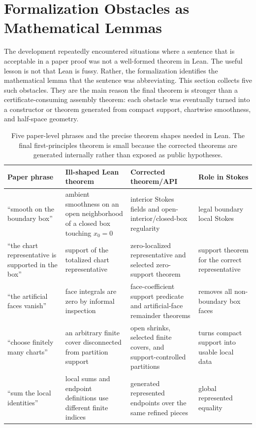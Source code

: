 \section{Formalization Obstacles as Mathematical Lemmas}
\label{sec:obstacles}

The development repeatedly encountered situations where a sentence that is
acceptable in a paper proof was not a well-formed theorem in Lean.  The useful
lesson is not that Lean is fussy.  Rather, the formalization identifies the
mathematical lemma that the sentence was abbreviating.  This section collects
five such obstacles.  They are the main reason the final theorem is stronger
than a certificate-consuming assembly theorem: each obstacle was eventually
turned into a constructor or theorem generated from compact support,
chartwise smoothness, and half-space geometry.

\begin{table}[t]
\centering
\scriptsize
\setlength{\tabcolsep}{3pt}
\begin{tabular}{p{}p{}p{}p{}}
\hline
Paper phrase & Ill-shaped Lean theorem & Corrected theorem/API & Role in Stokes \\
\hline
``smooth on the boundary box'' &
ambient smoothness on an open neighborhood of a closed box touching
\(x_0=0\) &
interior Stokes fields and open-interior/closed-box regularity &
legal boundary local Stokes \\

``the chart representative is supported in the box'' &
support of the totalized chart representative &
zero-localized representative and selected zero-support theorem &
support theorem for the correct representative \\

``the artificial faces vanish'' &
face integrals are zero by informal inspection &
face-coefficient support predicate and artificial-face remainder theorems &
removes all non-boundary box faces \\

``choose finitely many charts'' &
an arbitrary finite cover disconnected from partition support &
open shrinks, selected finite covers, and support-controlled partitions &
turns compact support into usable local data \\

``sum the local identities'' &
local sums and endpoint definitions use different finite indices &
generated represented endpoints over the same refined pieces &
global represented equality \\
\hline
\end{tabular}
\caption{Five paper-level phrases and the precise theorem shapes needed in
Lean.  The final first-principles theorem is small because the corrected
theorems are generated internally rather than exposed as public hypotheses.}
\label{tab:obstacle-map}
\end{table}


